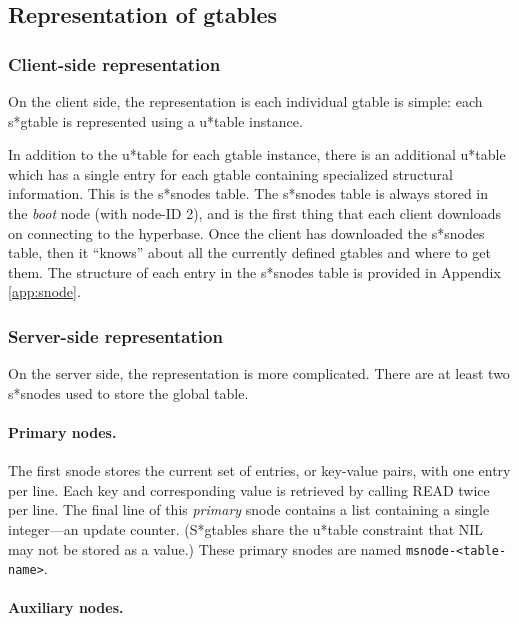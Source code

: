 \subsection{Representation of gtables}

\subsubsection{Client-side representation}

On the client side, the representation is each individual gtable is simple:
each s*gtable is represented using a u*table instance.

In addition to the u*table for each gtable instance, there is an additional
u*table which has a single entry for each gtable containing specialized
structural information.  This is the s*snodes table.  The s*snodes table is
always stored in the {\em boot} node (with node-ID 2), and is the first
thing that each client downloads on connecting to the hyperbase. Once the
client has downloaded the s*snodes table, then it ``knows'' about all the
currently defined gtables and where to get them. The structure of each
entry in the s*snodes table is provided in Appendix \ref{app:snode}.


\subsubsection{Server-side representation}

On the server side, the representation is more complicated.  There are at
least two s*snodes used to store the global table.  

\paragraph{Primary nodes.}

The first snode stores the current set of entries, or key-value pairs, with
one entry per line.  Each key and corresponding value is retrieved by
calling READ twice per line. The final line of this {\em primary} snode
contains a list containing a single integer---an update counter.
(S*gtables share the u*table constraint that NIL may not be stored as a
value.) These primary snodes are named {\tt msnode-<table-name>}.

\paragraph{Auxiliary nodes.}

